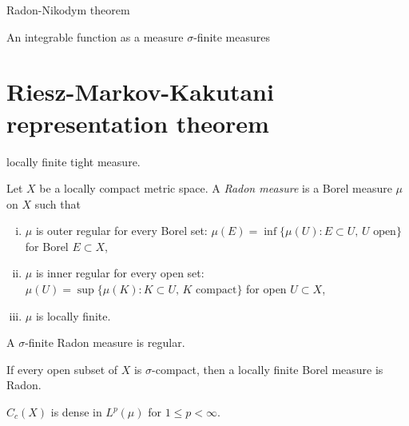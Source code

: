 \documentclass{../../large}
\begin{document}
Radon-Nikodym theorem

An integrable function as a measure
$\sigma$-finite measures

\section{Riesz-Markov-Kakutani representation theorem}




locally finite tight measure.


\begin{prb}
Let $X$ be a locally compact metric space.
A \emph{Radon measure} is a Borel measure $\mu$ on $X$ such that
\begin{enumerate}[(i)]
\item $\mu$ is outer regular for every Borel set: $\mu(E)=\inf\{\mu(U):E\subset U,\,U\text{ open}\}$ for Borel $E\subset X$,
\item $\mu$ is inner regular for every open set: $\mu(U)=\sup\{\mu(K):K\subset U,\,K\text{ compact}\}$ for open $U\subset X$,
\item $\mu$ is locally finite.
\end{enumerate}
\begin{parts}
\item A $\sigma$-finite Radon measure is regular.
\item If every open subset of $X$ is $\sigma$-compact, then a locally finite Borel measure is Radon.
\item $C_c(X)$ is dense in $L^p(\mu)$ for $1\le p<\infty$.
\end{parts}
\end{prb}
\end{document}
